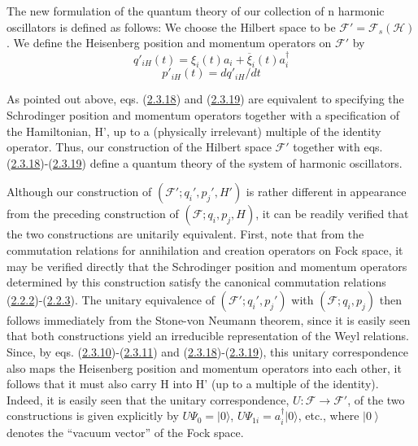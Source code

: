 \documentclass[11pt,a4paper]{article}
\providecommand{\ket}[1]{\left\lvert#1\right\rangle}
\begin{document}
The new formulation of the quantum theory of our collection of n harmonic oscillators is defined as follows: We choose the Hilbert space to be \(\mathcal{F}'=\mathcal{F}_s(\mathcal{H})\). We define the Heisenberg position and momentum operators on \(\mathcal{F}'\) by
\begin{equation*}
q'_{iH}(t) = \xi_i(t)a_i + \overline{\xi}_i(t)a_i^{\dagger} \tag{2.3.18}\label{eq:2.3.18}
\end{equation*}
\begin{equation*}
p'_{iH}(t) = dq'_{iH}/dt \tag{2.3.19}\label{eq:2.3.19}
\end{equation*}

As pointed out above, eqs. (\hyperref[eq:2.3.18]{2.3.18}) and (\hyperref[eq:2.3.19]{2.3.19}) are equivalent to specifying the Schrodinger position and momentum operators together with a specification of the Hamiltonian, H', up to a (physically irrelevant) multiple of the identity operator. Thus, our construction of the Hilbert space \(\mathcal{F}'\) together with eqs. (\hyperref[eq:2.3.18]{2.3.18})-(\hyperref[eq:2.3.19]{2.3.19}) define a quantum theory of the system of harmonic oscillators.

Although our construction of \((\mathcal{F}'; q_i', p_j', H')\) is rather different in appearance from the preceding construction of \((\mathcal{F}; q_i, p_j, H)\), it can be readily verified that the two constructions are unitarily equivalent. First, note that from the commutation relations for annihilation and creation operators on Fock space, it may be verified directly that the Schrodinger position and momentum operators determined by this construction satisfy the canonical commutation \hypertarget{source-39}{} relations (\hyperref[eq:2.2.2]{2.2.2})-(\hyperref[eq:2.2.3]{2.2.3}). The unitary equivalence of \((\mathcal{F}'; q_i', p_j')\) with \((\mathcal{F}; q_i, p_j)\) then follows immediately from the Stone-von Neumann theorem, since it is easily seen that both constructions yield an irreducible representation of the Weyl relations. Since, by eqs. (\hyperref[eq:2.3.10]{2.3.10})-(\hyperref[eq:2.3.11]{2.3.11}) and (\hyperref[eq:2.3.18]{2.3.18})-(\hyperref[eq:2.3.19]{2.3.19}), this unitary correspondence also maps the Heisenberg position and momentum operators into each other, it follows that it must also carry H into H' (up to a multiple of the identity). Indeed, it is easily seen that the unitary correspondence, \(U:\mathcal{F}\to\mathcal{F}'\), of the two constructions is given explicitly by \(U\Psi_0=\lvert 0\rangle \), \(U\Psi_{1i}=a_i^{\dagger} \lvert 0\rangle \), etc., where \(\ket{0}\) denotes the ``vacuum vector'' of the Fock space.
\end{document}
